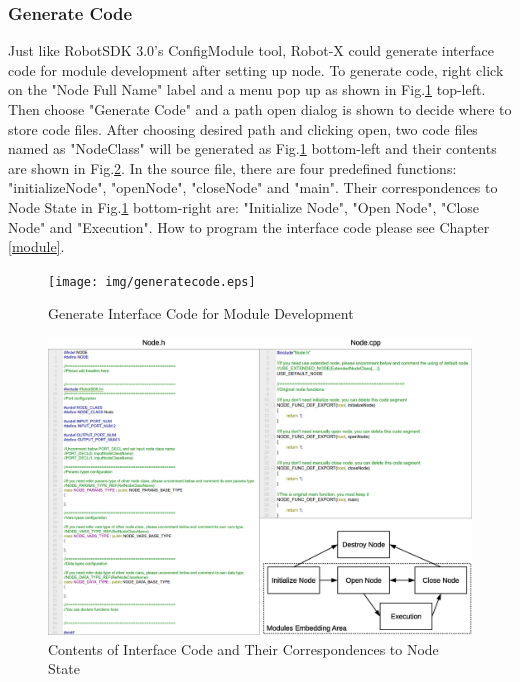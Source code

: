 \documentclass[a4paper,10pt]{book}
\begin{document}
\subsubsection{Generate Code}

Just like RobotSDK 3.0's ConfigModule tool, Robot-X could generate interface code for module development after setting up node. To generate code, right click on the "Node Full Name" label and a menu pop up as shown in Fig.\ref{fig:generatecode} top-left. Then choose "Generate Code" and a path open dialog is shown to decide where to store code files. After choosing desired path and clicking open, two code files named as "NodeClass" will be generated as Fig.\ref{fig:generatecode} bottom-left and their contents are shown in Fig.\ref{fig:code}. In the source file, there are four predefined functions: "initializeNode", "openNode", "closeNode" and "main". Their correspondences to Node State in Fig.\ref{fig:generatecode} bottom-right are: "Initialize Node", "Open Node", "Close Node" and "Execution". How to program the interface code please see Chapter \ref{module}.

\begin{figure}
 \centering
 \texttt{[image: img/generatecode.eps]}
 \caption{Generate Interface Code for Module Development}
 \label{fig:generatecode}
\end{figure}

\begin{figure}
 \centering
 \includegraphics[width=1.0\textwidth]{img/code.eps}
 \caption{Contents of Interface Code and Their Correspondences to Node State}
 \label{fig:code}
\end{figure}
\end{document}
